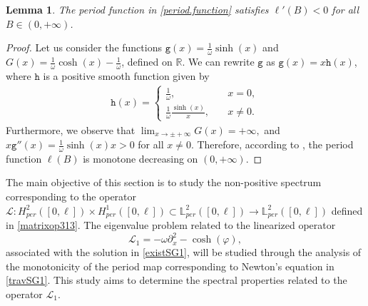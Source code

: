 \documentclass[12pt,reqno,a4paper]{amsart} %
\newtheorem{lema}{Lemma}[section]
\numberwithin{equation}{section}
\numberwithin{figure}{section}
\begin{document}
 		\begin{lema}
 		\label{lem.period.function} The period function in \eqref{period.function} satisfies $ 	\ell'(B)<0$ for all $B\in(0,+\infty)$. 
 	\end{lema}
 	\begin{proof}
 		Let us consider the functions $	\displaystyle\mathtt{g}(x)=\frac{1}{\omega} \sinh(x)$ and  $\displaystyle	G(x)=\frac{1}{\omega} \cosh(x) -\frac{1}{\omega}$, defined on $\mathbb{R}$. We can rewrite $\mathtt{g}$  as $\mathtt{g}(x)= x \mathtt{h}(x)$, where $\mathtt{h}$ is a positive 
 		smooth function given by 
 		\begin{align*}
 		\mathtt{h}(x)=\begin{cases}
 				\frac{1}{\omega}, \quad 	&x=0, \\  \frac{1}{\omega}\frac{\sinh(x)}{x}, \quad &x\neq 0.
 			\end{cases}
 		\end{align*}Furthermore, we observe that
 		$\displaystyle\lim_{x\rightarrow\pm +\infty}G(x)=+\infty,$
 		and $x \mathtt{g}''(x)= \frac{1}{\omega}\sinh(x) x >0 $ for all $x\neq 0$. Therefore, according to \cite[Corollary 2.3]{chowwang}, the period function $ \ell(B)$ is monotone decreasing on $(0,+\infty)$.
 	 	\end{proof}
 	
The main objective of this section is to study the non-positive spectrum corresponding to the operator
  $\mathcal{L}:H^2_{per}([0,\ell])\times H^1_{per}([0,\ell]) \subset\mathbb{L}^2_{per}([0,\ell])\rightarrow \mathbb{L}^2_{per}([0,\ell])$ defined in \eqref{matrixop313}. The eigenvalue problem related to the linearized operator 
 	\begin{equation}\label{opL1}
 		\mathcal{L}_1=-\omega\partial_x^2-\cosh(\varphi),
 	\end{equation}
 	associated with the solution in \eqref{existSG1}, 
 	will be studied through the analysis of the monotonicity of the period map corresponding to Newton’s equation in \eqref{travSG1}. This study aims to determine the spectral properties related to the operator $\mathcal{L}_1$. 
 	
\end{document}

